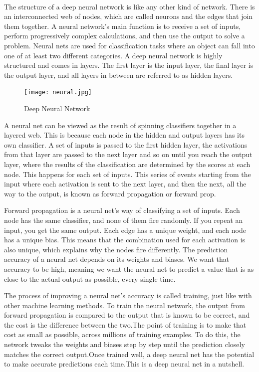 \paragraph{}
The structure of a deep neural network is like any other kind of network. There is an interconnected web of nodes, which are called neurons and the edges that join them together. A neural network's main function is to receive a set of inputs, perform progressively complex calculations, and then use the output to solve a problem.
Neural nets are used for classification tasks where an object can fall into one of at least two different categories. A deep neural network is highly structured and comes in layers. The first layer is the input layer, the final layer is the output layer, and all layers in between are referred to as hidden layers.
\begin{figure}[h]
	\label{ss}
	\centering
	\texttt{[image: neural.jpg]}
	\caption{Deep Neural Network}
\end{figure}
A neural net can be viewed as the result of spinning classifiers together in a layered web.
This is because each node in the hidden and output layers has its own classifier. A set of inputs is passed to the first hidden layer, the activations from that layer are passed to the next layer and so on until you reach the output layer, where the results of the classification are determined by the scores at each node. This happens for each set of inputs.
This series of events starting from the input where each activation is sent to the next layer,
and then the next, all the way to the output, is known as forward propagation or forward prop.


Forward propagation is a neural net's way of classifying a set of inputs. Each node has the same classifier, and none of them fire randomly. If you repeat an input, you get the same output. Each edge has a unique weight, and each node has a unique bias. This means that the combination used for each activation is also unique, which explains why the nodes fire differently. The prediction accuracy of a neural net depends on its weights and biases. We want that accuracy to be high, meaning we want the neural net to predict a value that is as close to the actual output as possible, every single time.

The process of improving a neural net’s accuracy is called training, just like with other machine learning methods. To train the neural network, the output from forward propagation is compared to the output that is known to be correct, and the cost is the difference between the two.The point of training is to make that cost as small as possible, across millions of training examples. To do this, the network tweaks the weights and biases step by step
until the prediction closely matches the correct output.Once trained well, a deep neural net has the potential to make accurate predictions each time.This is a deep neural net in a nutshell.


